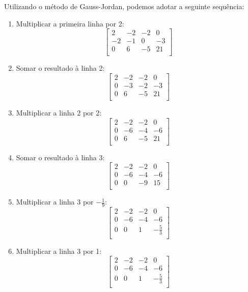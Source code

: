 Utilizando o método de Gauss-Jordan, podemos adotar a seguinte sequência:
\begin{enumerate}
 
	\item Multiplicar a primeira linha por 2:
	\[
	\begin{bmatrix}
		2 & -2 & -2 & 0 \\
		-2 & -1 & 0 & -3 \\
		0 & 6 & -5 & 21 \\
	\end{bmatrix}
	\]
	
	\item Somar o resultado à linha 2:
	\[
	\begin{bmatrix}
		2 & -2 & -2 & 0 \\
		0 & -3 & -2 & -3 \\
		0 & 6 & -5 & 21 \\
	\end{bmatrix}
	\]
	
	\item Multiplicar a linha 2 por 2:
	\[
	\begin{bmatrix}
		2 & -2 & -2 & 0 \\
		0 & -6 & -4 & -6 \\
		0 & 6 & -5 & 21 \\
	\end{bmatrix}
	\]
	
	\item Somar o resultado à linha 3:
	\[
	\begin{bmatrix}
		2 & -2 & -2 & 0 \\
		0 & -6 & -4 & -6 \\
		0 & 0 & -9 & 15 \\
	\end{bmatrix}
	\]
	
	\item Multiplicar a linha 3 por $-\frac{1}{9}$:
	\[
	\begin{bmatrix}
		2 & -2 & -2 & 0 \\
		0 & -6 & -4 & -6 \\
		0 & 0 & 1 & -\frac{5}{3} \\
	\end{bmatrix}
	\]
	
	\item Multiplicar a linha 3 por 1:
	\[
	\begin{bmatrix}
		2 & -2 & -2 & 0 \\
		0 & -6 & -4 & -6 \\
		0 & 0 & 1 & -\frac{5}{3} \\
	\end{bmatrix}
	\]
	

\end{enumerate}

